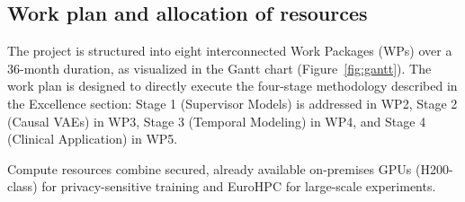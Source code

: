 \documentclass[11pt, a4paper]{article}
\begin{document}
\subsection{Work plan and allocation of resources}
The project is structured into eight interconnected Work Packages (WPs) over a 36-month duration, as visualized in the Gantt chart (Figure~\ref{fig:gantt}). The work plan is designed to directly execute the four-stage methodology described in the Excellence section: Stage 1 (Supervisor Models) is addressed in WP2, Stage 2 (Causal VAEs) in WP3, Stage 3 (Temporal Modeling) in WP4, and Stage 4 (Clinical Application) in WP5.

Compute resources combine secured, already available on-premises GPUs (H200-class) for privacy-sensitive training and EuroHPC for large-scale experiments.
\end{document}
